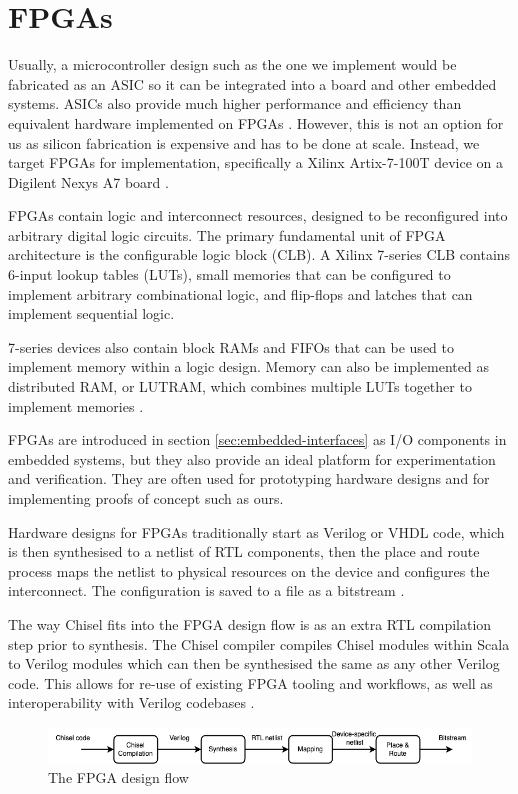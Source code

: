 \section{FPGAs}

Usually, a microcontroller design such as the one we implement would be fabricated as an ASIC so it can be integrated into a board and other embedded systems. ASICs also provide much higher performance and efficiency than equivalent hardware implemented on FPGAs \cite{fpga_v_asic}. However, this is not an option for us as silicon fabrication is expensive and has to be done at scale. Instead, we target FPGAs for implementation, specifically a Xilinx Artix-7-100T device on a Digilent Nexys A7 board \cite{digilent}.

FPGAs contain logic and interconnect resources, designed to be reconfigured into arbitrary digital logic circuits. The primary fundamental unit of FPGA architecture is the configurable logic block (CLB). A Xilinx 7-series CLB contains 6-input lookup tables (LUTs), small memories that can be configured to implement arbitrary combinational logic, and flip-flops and latches that can implement sequential logic.

7-series devices also contain block RAMs and FIFOs that can be used to implement memory within a logic design. Memory can also be implemented as distributed RAM, or LUTRAM, which combines multiple LUTs together to implement memories \cite{fpga_arch}.

FPGAs are introduced in section \ref{sec:embedded-interfaces} as I/O components in embedded systems, but they also provide an ideal platform for experimentation and verification. They are often used for prototyping hardware designs and for implementing proofs of concept such as ours.

Hardware designs for FPGAs traditionally start as Verilog or VHDL code, which is then synthesised to a netlist of RTL components, then the place and route process maps the netlist to physical resources on the device and configures the interconnect. The configuration is saved to a file as a bitstream \cite{vivado_design}.

The way Chisel fits into the FPGA design flow is as an extra RTL compilation step prior to synthesis. The Chisel compiler compiles Chisel modules within Scala to Verilog modules which can then be synthesised the same as any other Verilog code. This allows for re-use of existing FPGA tooling and workflows, as well as interoperability with Verilog codebases \cite{chisel}.

\begin{figure}[h!]
    \centering
    \includegraphics[width=\textwidth]{../img/design-flow.png}
    \caption{The FPGA design flow}
    \label{fig:design-flow}
\end{figure}